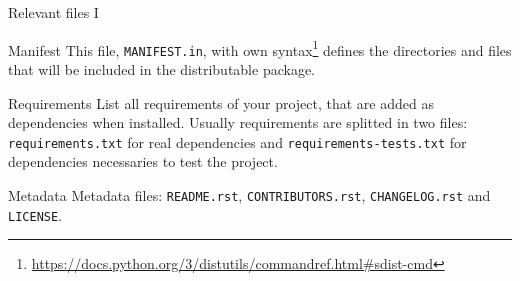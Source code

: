 \begin{frame}[fragile]{Relevant files I}
    \begin{block}{Manifest}
        This file, \texttt{MANIFEST.in}, with own syntax\footnote[1]{\href{https://docs.python.org/3/distutils/commandref.html#sdist-cmd}{https://docs.python.org/3/distutils/commandref.html#sdist-cmd}} defines the directories and files that will be included in the distributable package.
    \end{block}
    \pause
    \begin{block}{Requirements}
        List all requirements of your project, that are added as dependencies when installed. Usually requirements are splitted in two files: \texttt{requirements.txt} for real dependencies and \texttt{requirements-tests.txt} for dependencies necessaries to test the project.
    \end{block}
    \pause
    \begin{block}{Metadata}
        Metadata files: \texttt{README.rst}, \texttt{CONTRIBUTORS.rst}, \texttt{CHANGELOG.rst} and \texttt{LICENSE}.
    \end{block}
\end{frame}

